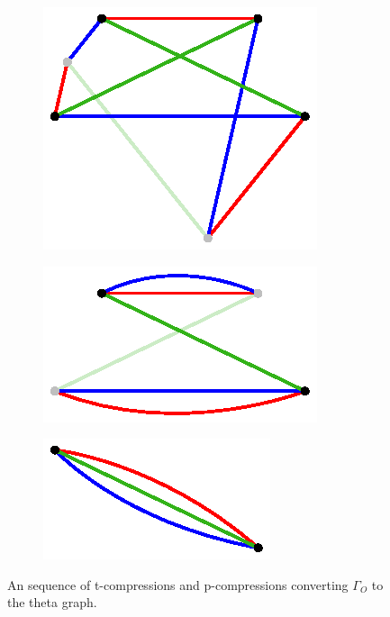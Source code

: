 \documentclass[11pt, oneside]{amsart}
\theoremstyle{theorem}
\theoremstyle{definition}
\theoremstyle{theorem}
\begin{document}
\begin{figure}[h!]
\begin{subfigure}{.24\textwidth}
  \includegraphics[width=.9\linewidth]{heawood5.eps}
    \label{ox5}
\end{subfigure}%
\begin{subfigure}{.24\textwidth}
  \centering
  \includegraphics[width=.9\linewidth]{heawood6.eps}
  \label{ox6}
\end{subfigure}
\begin{subfigure}{.24\textwidth}
  \centering
  \includegraphics[width=.9\linewidth]{heawood7.eps}
  \label{ox7}
\end{subfigure}%
\caption{An sequence of t-compressions and p-compressions converting $\Gamma_O$ to the theta graph.}
\label{ox}
\end{figure}
\end{document}

